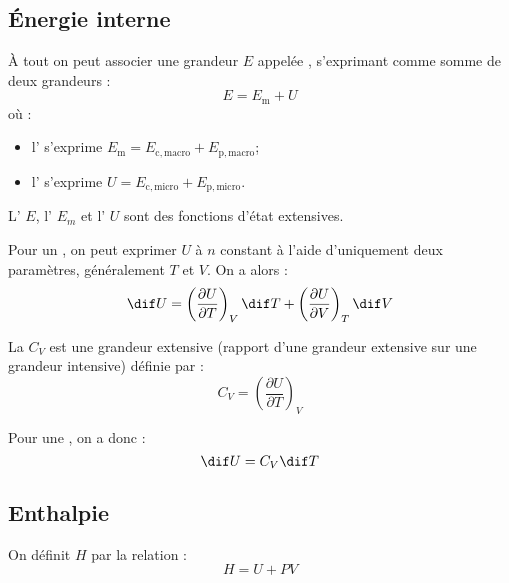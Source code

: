 \subsection{Énergie interne}

\begin{definition}
À tout  on peut associer une grandeur $E$ appelée , s'exprimant comme somme de deux grandeurs :
\[E = E_{\mathrm{m}} + U\]
où :
\begin{itemize}
\item l' s'exprime $E_{\mathrm{m}} = E_{\mathrm{c}, \mathrm{macro}} + E_{\mathrm{p}, \mathrm{macro}}$;
\item l' s'exprime $U = E_{\mathrm{c}, \mathrm{micro}} + E_{\mathrm{p}, \mathrm{micro}}$.
\end{itemize}
\end{definition}

\begin{propriete}[admis]
L' $E$, l' $E_m$ et l' $U$ sont des fonctions d'état extensives.
\end{propriete}

\begin{propriete}
Pour un , on peut exprimer $U$ à $n$ constant à l'aide d'uniquement deux paramètres, généralement $T$ et $V$. On a alors :
\[\dif U = \left(\frac{\partial U}{\partial T}\right)_V \dif T + \left(\frac{\partial U}{\partial V}\right)_T \dif V\]
\end{propriete}

\begin{definition}
La  $C_V$ est une grandeur extensive (rapport d'une grandeur extensive sur une grandeur intensive) définie par :
\[C_V = \left(\frac{\partial U}{\partial T}\right)_V\]
\end{definition}

\begin{remarque}
Pour une , on a donc :
\[\dif U = C_V \dif T\]
\end{remarque}



\subsection{Enthalpie}

\begin{definition}
On définit  $H$ par la relation :
\[H = U + PV\]
\end{definition}

